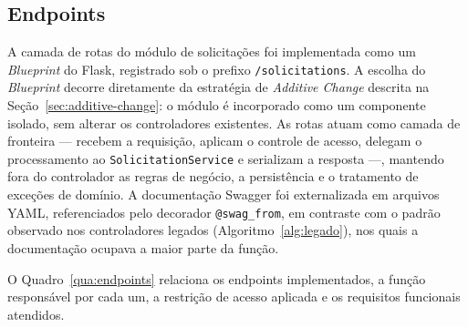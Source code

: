\subsection{Endpoints}
\label{sec:endpoints}

A camada de rotas do módulo de solicitações foi implementada como um 
\textit{Blueprint} do Flask, registrado sob o prefixo \texttt{/solicitations}. 
A escolha do \textit{Blueprint} decorre diretamente da estratégia de 
\textit{Additive Change} descrita na Seção~\ref{sec:additive-change}: 
o módulo é incorporado como um componente isolado, sem alterar os 
controladores existentes. As rotas atuam como camada de fronteira — 
recebem a requisição, aplicam o controle de acesso, delegam o 
processamento ao \texttt{SolicitationService} e serializam a resposta —, 
mantendo fora do controlador as regras de negócio, a persistência e 
o tratamento de exceções de domínio. A documentação Swagger foi 
externalizada em arquivos YAML, referenciados pelo decorador 
\texttt{@swag\_from}, em contraste com o padrão observado nos 
controladores legados (Algoritmo~\ref{alg:legado}), nos quais a 
documentação ocupava a maior parte da função.

O Quadro~\ref{qua:endpoints} relaciona os endpoints implementados, 
a função responsável por cada um, a restrição de acesso aplicada e 
os requisitos funcionais atendidos.

